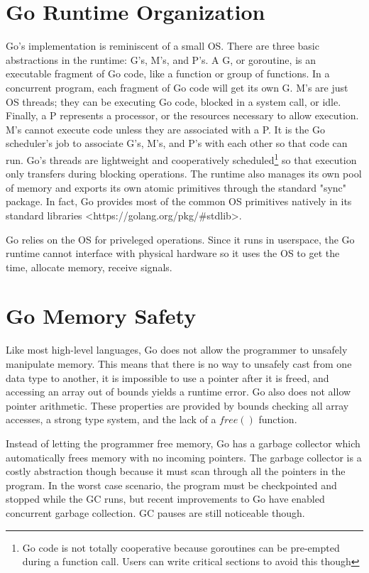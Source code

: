 \section{Go Runtime Organization}
Go's implementation is reminiscent of a small OS. There are three basic
abstractions in the runtime: G's, M's, and P's. A G, or goroutine, is an
executable fragment of Go code, like a function or group of functions. In a concurrent program,
each fragment of Go code will get its
own G. M's are just OS threads; they can be executing Go code, blocked in a system call,
or idle. Finally, a P represents a processor, or the resources necessary to
allow execution. M's cannot execute code unless they are associated with a P.
It is the Go scheduler's job to associate G's, M's, and P's with each other so
that code can run. Go's threads are lightweight and
cooperatively scheduled\footnote{Go code is not totally cooperative because goroutines can be pre-empted during a function call. Users can write critical sections to avoid this though}
so that execution only transfers during
blocking operations. The runtime also manages its own pool of memory
and exports its own atomic primitives through the standard "sync"
package. In fact, Go provides most of the common OS primitives natively
in its standard libraries <https://golang.org/pkg/\#stdlib>.

Go relies on the OS for priveleged operations. Since it runs in userspace,
the Go runtime cannot interface with physical hardware so it uses the OS
to get the time, allocate memory, receive signals.


\section{Go Memory Safety}
Like most high-level languages, Go does not allow the programmer to unsafely
manipulate memory. This means that there is no way to unsafely cast from one data type
to another, it is impossible to use a pointer after it is freed, and accessing
an array out of bounds yields a runtime error. Go also does not allow pointer arithmetic.
These properties are provided by bounds checking all array accesses, a strong type system,
and the lack of a $free()$ function.

Instead of letting the programmer free memory, Go
has a garbage collector which automatically frees memory with no incoming pointers.
The garbage collector is a costly abstraction though because it must scan through all
the pointers in the program. In the worst case scenario, the program must be checkpointed and
stopped while the GC runs, but recent improvements to Go have enabled concurrent garbage collection.
GC pauses are still noticeable though.

